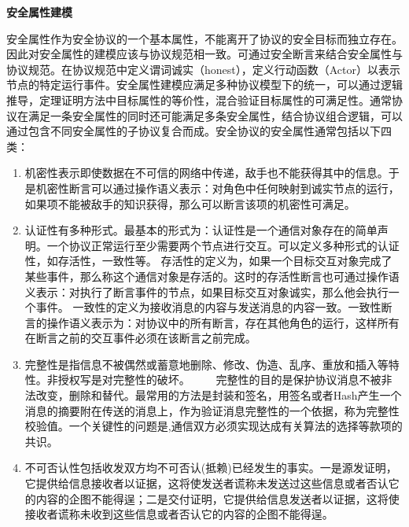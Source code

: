 \textbf{安全属性建模}


安全属性作为安全协议的一个基本属性，不能离开了协议的安全目标而独立存在。因此对安全属性的建模应该与协议规范相一致。可通过安全断言来结合安全属性与协议规范。在协议规范中定义谓词诚实（honest），定义行动函数（Actor）以表示节点的特定运行事件。安全属性建模应满足多种协议模型下的统一，可以通过逻辑推导，定理证明方法中目标属性的等价性，混合验证目标属性的可满足性。通常协议在满足一条安全属性的同时还可能满足多条安全属性，结合协议组合逻辑，可以通过包含不同安全属性的子协议复合而成。安全协议的安全属性通常包括以下四类：
\begin{enumerate}
\item 
机密性表示即使数据在不可信的网络中传递，敌手也不能获得其中的信息。于是机密性断言可以通过操作语义表示：对角色中任何映射到诚实节点的运行，如果项不能被敌手的知识获得，那么可以断言该项的机密性可满足。
\item 
认证性有多种形式。最基本的形式为：认证性是一个通信对象存在的简单声明。一个协议正常运行至少需要两个节点进行交互。可以定义多种形式的认证性，如存活性，一致性等。
存活性的定义为，如果一个目标交互对象完成了某些事件，那么称这个通信对象是存活的。这时的存活性断言也可通过操作语义表示：对执行了断言事件的节点，如果目标交互对象诚实，那么他会执行一个事件。
一致性的定义为接收消息的内容与发送消息的内容一致。一致性断言的操作语义表示为：对协议中的所有断言，存在其他角色的运行，这样所有在断言之前的交互事件必须在该断言之前完成。
\item 完整性是指信息不被偶然或蓄意地删除、修改、伪造、乱序、重放和插入等特性。非授权写是对完整性的破坏。
　　完整性的目的是保护协议消息不被非法改变，删除和替代。最常用的方法是封装和签名，用签名或者Hash产生一个消息的摘要附在传送的消息上，作为验证消息完整性的一个依据，称为完整性校验值。一个关键性的问题是,通信双方必须实现达成有关算法的选择等款项的共识。
\item 不可否认性包括收发双方均不可否认(抵赖)已经发生的事实。一是源发证明，它提供给信息接收者以证据，这将使发送者谎称未发送过这些信息或者否认它的内容的企图不能得逞；二是交付证明，它提供给信息发送者以证据，这将使接收者谎称未收到这些信息或者否认它的内容的企图不能得逞。

\end{enumerate}





